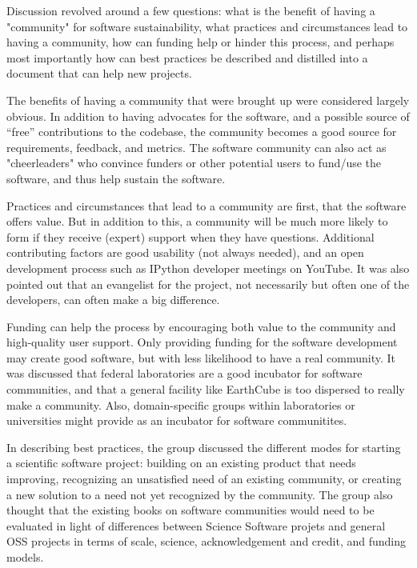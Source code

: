 Discussion revolved around a few questions: what is the benefit of having a "community" for software sustainability, what practices and circumstances lead to having a community, how can funding help or hinder this process, and perhaps most importantly how can best practices be described and distilled into a document that can help new projects.

The benefits of having a community that were brought up were considered largely obvious. In addition to having advocates for the software, and a possible source of ``free'' contributions to the codebase, the community becomes a good source for requirements, feedback, and metrics. The software community can also act as "cheerleaders" who convince funders or other potential users to fund/use the software, and thus help sustain the software.

Practices and circumstances that lead to a community are first, that the software offers value. But in addition to this, a community will be much more likely to form if they receive (expert) support when they have questions. Additional contributing factors are good usability (not always needed), and an open development process such as IPython developer meetings on YouTube. It was also pointed out that an evangelist for the project, not necessarily but often one of the developers, can often make a big difference. 

Funding can help the process by encouraging both value to the community and high-quality user support. Only providing funding for the software development may create good software, but with less likelihood to have a real community. It was discussed that federal laboratories are a good incubator for software communities, and that a general facility like EarthCube is too dispersed to really make a community. Also, domain-specific groups within laboratories or universities might provide as an incubator for software communitites.

In describing best practices, the group discussed the different modes for starting a scientific software project: building on an existing product that needs improving, recognizing an unsatisfied need of an existing community, or creating a new solution to a need not yet recognized by the community. The group also thought that the existing books on software communities would need to be evaluated in light of differences between Science Software projets and general OSS projects in terms of scale, science, acknowledgement and credit, and funding models.

